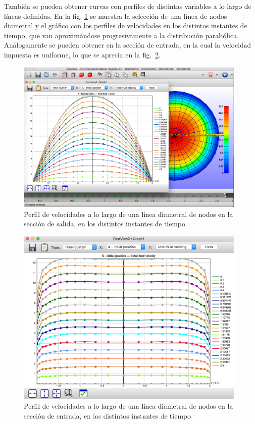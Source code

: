 También se pueden obtener curvas con perfiles de distintas variables a lo largo de líneas definidas.
En la fig. \ref{fig:08-post-vprof-out-1} se muestra la selección de una línea de nodos diametral y el gráfico con los perfiles de velocidades en los distintos instantes de tiempo, que van aproximándose progresivamente a la distribución parabólica.
Análogamente se pueden obtener en la sección de entrada, en la cual la velocidad impuesta es uniforme, lo que se aprecia en la fig.~\ref{fig:08-post-vprof-in-1}.
\begin{figure}[!ht]
\centering
\includegraphics[width=0.5\linewidth]{figuras_4/08-post-vprof-out-1.png}
\caption{Perfil de velocidades a lo largo de una línea diametral de nodos en la sección de salida, en los distintos instantes de tiempo}
\label{fig:08-post-vprof-out-1}
\end{figure}
\begin{figure}[!ht]
\centering
\includegraphics[width=0.5\linewidth]{figuras_4/08-post-vprof-in-1.png}
\caption{Perfil de velocidades a lo largo de una línea diametral de nodos en la sección de entrada, en los distintos instantes de tiempo}
\label{fig:08-post-vprof-in-1}
\end{figure}

